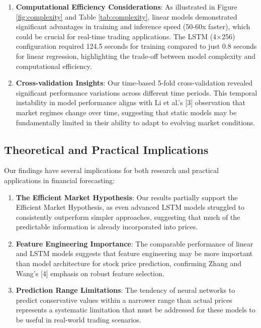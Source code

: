 \documentclass[sigconf]{acmart}
\begin{document}
\begin{enumerate}
\item \textbf{Computational Efficiency Considerations}: As illustrated in Figure \ref{fig:complexity} and Table \ref{tab:complexity}, linear models demonstrated significant advantages in training and inference speed (50-60x faster), which could be crucial for real-time trading applications. The LSTM (4×256) configuration required 124.5 seconds for training compared to just 0.8 seconds for linear regression, highlighting the trade-off between model complexity and computational efficiency.

\item \textbf{Cross-validation Insights}: Our time-based 5-fold cross-validation revealed significant performance variations across different time periods. This temporal instability in model performance aligns with Li et al.'s [3] observation that market regimes change over time, suggesting that static models may be fundamentally limited in their ability to adapt to evolving market conditions.
\end{enumerate}

\subsection{Theoretical and Practical Implications}

Our findings have several implications for both research and practical applications in financial forecasting:

\begin{enumerate}
\item \textbf{The Efficient Market Hypothesis}: Our results partially support the Efficient Market Hypothesis, as even advanced LSTM models struggled to consistently outperform simpler approaches, suggesting that much of the predictable information is already incorporated into prices.

\item \textbf{Feature Engineering Importance}: The comparable performance of linear and LSTM models suggests that feature engineering may be more important than model architecture for stock price prediction, confirming Zhang and Wang's [4] emphasis on robust feature selection.

\item \textbf{Prediction Range Limitations}: The tendency of neural networks to predict conservative values within a narrower range than actual prices represents a systematic limitation that must be addressed for these models to be useful in real-world trading scenarios.
\end{enumerate}
\end{document}
